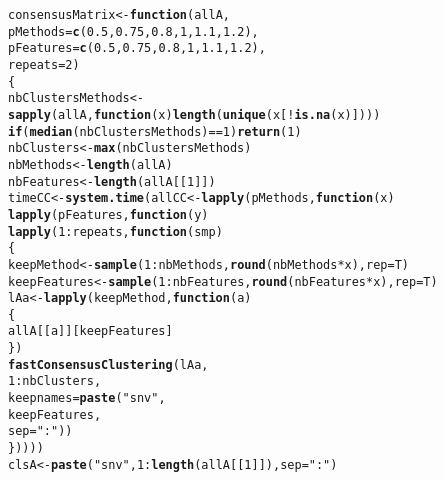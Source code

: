 \documentclass{article}\usepackage[]{graphicx}\usepackage[]{color}
\makeatletter
\newcommand{\hlnum}[1]{\textcolor[rgb]{0.686,0.059,0.569}{#1}}%
\newcommand{\hlstr}[1]{\textcolor[rgb]{0.192,0.494,0.8}{#1}}%
\newcommand{\hlopt}[1]{\textcolor[rgb]{0,0,0}{#1}}%
\newcommand{\hlstd}[1]{\textcolor[rgb]{0.345,0.345,0.345}{#1}}%
\newcommand{\hlkwa}[1]{\textcolor[rgb]{0.161,0.373,0.58}{\textbf{#1}}}%
\newcommand{\hlkwb}[1]{\textcolor[rgb]{0.69,0.353,0.396}{#1}}%
\newcommand{\hlkwc}[1]{\textcolor[rgb]{0.333,0.667,0.333}{#1}}%
\newcommand{\hlkwd}[1]{\textcolor[rgb]{0.737,0.353,0.396}{\textbf{#1}}}%
\newenvironment{kframe}{%
 \def\at@end@of@kframe{}%
 \ifinner\ifhmode%
  \def\at@end@of@kframe{\end{minipage}}%
  \begin{minipage}{\columnwidth}%
 \fi\fi%
 \def\FrameCommand##1{\hskip\@totalleftmargin \hskip-\fboxsep
 \colorbox{shadecolor}{##1}\hskip-\fboxsep
     \hskip-\linewidth \hskip-\@totalleftmargin \hskip\columnwidth}%
 \MakeFramed {\advance\hsize-\width
   \@totalleftmargin\z@ \linewidth\hsize
   \@setminipage}}%
 {\par\unskip\endMakeFramed%
 \at@end@of@kframe}
\newenvironment{knitrout}{}{} %
\makeatother
\begin{document}
\begin{knitrout}
\begin{kframe}
\begin{alltt}
\hlstd{consensusMatrix} \hlkwb{<-} \hlkwa{function}\hlstd{(}\hlkwc{allA}\hlstd{,}
                            \hlkwc{pMethods}\hlstd{=}\hlkwd{c}\hlstd{(}\hlnum{0.5}\hlstd{,}\hlnum{0.75}\hlstd{,}\hlnum{0.8}\hlstd{,}\hlnum{1}\hlstd{,}\hlnum{1.1}\hlstd{,}\hlnum{1.2}\hlstd{),}
                            \hlkwc{pFeatures}\hlstd{=}\hlkwd{c}\hlstd{(}\hlnum{0.5}\hlstd{,}\hlnum{0.75}\hlstd{,}\hlnum{0.8}\hlstd{,}\hlnum{1}\hlstd{,}\hlnum{1.1}\hlstd{,}\hlnum{1.2}\hlstd{),}
                            \hlkwc{repeats}\hlstd{=}\hlnum{2}\hlstd{)}
\hlstd{\{}
    \hlstd{nbClustersMethods} \hlkwb{<-}\hlkwd{sapply}\hlstd{(allA,}\hlkwa{function}\hlstd{(}\hlkwc{x}\hlstd{)} \hlkwd{length}\hlstd{(}\hlkwd{unique}\hlstd{(x[}\hlopt{!}\hlkwd{is.na}\hlstd{(x)])))}
    \hlkwa{if}\hlstd{(}\hlkwd{median}\hlstd{(nbClustersMethods)}\hlopt{==}\hlnum{1}\hlstd{)} \hlkwd{return}\hlstd{(}\hlnum{1}\hlstd{)}
    \hlstd{nbClusters} \hlkwb{<-} \hlkwd{max}\hlstd{(nbClustersMethods)}
    \hlstd{nbMethods} \hlkwb{<-} \hlkwd{length}\hlstd{(allA)}
    \hlstd{nbFeatures} \hlkwb{<-} \hlkwd{length}\hlstd{(allA[[}\hlnum{1}\hlstd{]])}
    \hlstd{timeCC} \hlkwb{<-} \hlkwd{system.time}\hlstd{(allCC} \hlkwb{<-} \hlkwd{lapply}\hlstd{(pMethods,}\hlkwa{function}\hlstd{(}\hlkwc{x}\hlstd{)}
        \hlkwd{lapply}\hlstd{(pFeatures,}\hlkwa{function}\hlstd{(}\hlkwc{y}\hlstd{)}
            \hlkwd{lapply}\hlstd{(}\hlnum{1}\hlopt{:}\hlstd{repeats,}\hlkwa{function}\hlstd{(}\hlkwc{smp}\hlstd{)}
            \hlstd{\{}
                \hlstd{keepMethod} \hlkwb{<-} \hlkwd{sample}\hlstd{(}\hlnum{1}\hlopt{:}\hlstd{nbMethods,}\hlkwd{round}\hlstd{(nbMethods}\hlopt{*}\hlstd{x),}\hlkwc{rep}\hlstd{=T)}
                \hlstd{keepFeatures} \hlkwb{<-} \hlkwd{sample}\hlstd{(}\hlnum{1}\hlopt{:}\hlstd{nbFeatures,}\hlkwd{round}\hlstd{(nbFeatures}\hlopt{*}\hlstd{x),}\hlkwc{rep}\hlstd{=T)}
                \hlstd{lAa} \hlkwb{<-} \hlkwd{lapply}\hlstd{(keepMethod,}\hlkwa{function}\hlstd{(}\hlkwc{a}\hlstd{)}
                \hlstd{\{}
                    \hlstd{allA[[a]][keepFeatures]}
                \hlstd{\})}
                \hlkwd{fastConsensusClustering}\hlstd{(lAa,}
                                        \hlnum{1}\hlopt{:}\hlstd{nbClusters,}
                                        \hlkwc{keepnames}\hlstd{=}\hlkwd{paste}\hlstd{(}\hlstr{"snv"}\hlstd{,}
                                                        \hlstd{keepFeatures,}
                                                        \hlkwc{sep}\hlstd{=}\hlstr{":"}\hlstd{))}
            \hlstd{\}))))}
    \hlstd{clsA} \hlkwb{<-} \hlkwd{paste}\hlstd{(}\hlstr{"snv"}\hlstd{,}\hlnum{1}\hlopt{:}\hlkwd{length}\hlstd{(allA[[}\hlnum{1}\hlstd{]]),}\hlkwc{sep}\hlstd{=}\hlstr{":"}\hlstd{)}

\end{alltt}
\end{kframe}
\end{knitrout}
\end{document}
